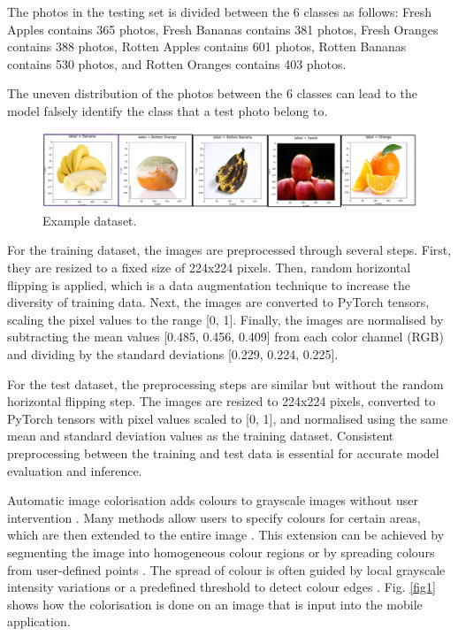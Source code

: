 \documentclass[conference]{IEEEtran}
\begin{document}
The photos in the testing set is divided between the 6 classes as follows: Fresh Apples contains 365 photos, Fresh Bananas contains 381 photos, Fresh Oranges contains 388 photos, Rotten Apples contains 601 photos, Rotten Bananas contains 530 photos, and Rotten Oranges contains 403 photos.

The uneven distribution of the photos between the 6 classes can lead to the model falsely identify the class that a test photo belong to.

\begin{figure}[h]
    \centering
    \includegraphics[width=\linewidth]{Example_data.png}
    \caption{Example dataset.}
    \label{fig}
\end{figure}

For the training dataset, the images are preprocessed through several steps. First, they are resized to a fixed size of 224x224 pixels. Then, random horizontal flipping is applied, which is a data augmentation technique to increase the diversity of training data. Next, the images are converted to PyTorch tensors, scaling the pixel values to the range [0, 1]. Finally, the images are normalised by subtracting the mean values [0.485, 0.456, 0.409] from each color channel (RGB) and dividing by the standard deviations [0.229, 0.224, 0.225].

For the test dataset, the preprocessing steps are similar but without the random horizontal flipping step. The images are resized to 224x224 pixels, converted to PyTorch tensors with pixel values scaled to [0, 1], and normalised using the same mean and standard deviation values as the training dataset. Consistent preprocessing between the training and test data is essential for accurate model evaluation and inference.

Automatic image colorisation adds colours to grayscale images without user intervention \cite{b11}. Many methods allow users to specify colours for certain areas, which are then extended to the entire image \cite{b11}. This extension can be achieved by segmenting the image into homogeneous colour regions or by spreading colours from user-defined points \cite{b11}. The spread of colour is often guided by local grayscale intensity variations or a predefined threshold to detect colour edges \cite{b11}. Fig. \ref{fig1} shows how the colorisation is done on an image that is input into the mobile application.
\end{document}
